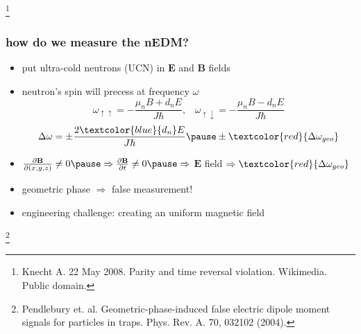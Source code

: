 \documentclass[handout]{beamer}
\renewcommand{\vec}{\mathbf}
\newcommand{\bottomcite}{\let\thefootnote\relax\footnote}
\begin{document}
\begin{frame}
\begin{columns}
    \end{columns}
    
    \bottomcite{Knecht A. 22 May 2008. Parity and time reversal violation. Wikimedia. Public domain.}

\end{frame}

\begin{frame}
\frametitle{how do we measure the nEDM?}

    \begin{itemize}
        \item put ultra-cold neutrons (UCN) in $\vec{E}$ and $\vec{B}$ fields \pause
        \item neutron's spin will precess at frequency $\omega$
        \begin{equation}
        \omega_{\uparrow\uparrow} = -\frac{\mu_n B + d_n E}{J\hbar}, \;\;\;
        \omega_{\uparrow\downarrow} = -\frac{\mu_n B - d_n E}{J\hbar}
        \end{equation} \pause
        \begin{equation}
        \Delta\omega = \pm\frac{2 \textcolor{blue}{d_n} E}{J\hbar} \pause \pm 
        \textcolor{red}{\Delta\omega_{geo}}
        \end{equation} \pause
        \item $\frac{\partial \vec{B}}{\partial (x,y,z)} \neq 0 \pause \Rightarrow
        \frac{\partial \vec{B}}{\partial t} \neq 0 \pause \Rightarrow$ $\vec{E}$ field
        \pause
        $\Rightarrow \textcolor{red}{\Delta\omega_{geo}}$ \pause
        \bigskip
        \item geometric phase $\Rightarrow$ false measurement! \pause
        \item engineering challenge: creating an uniform magnetic field
    \end{itemize}

    \bottomcite{Pendlebury et. al. Geometric-phase-induced false electric dipole moment signals
    for particles in traps. Phys. Rev. A. 70, 032102 (2004).}

\end{frame}
\end{document}
